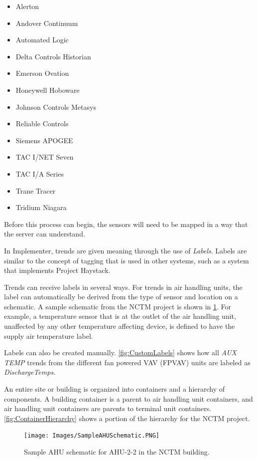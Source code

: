 \begin{itemize}
    \item Alerton
    \item Andover Continuum
    \item Automated Logic
    \item Delta Controls Historian
    \item Emerson Ovation
    \item Honeywell Hoboware
    \item Johnson Controls Metasys
    \item Reliable Controls
    \item Siemens APOGEE
    \item TAC I/NET Seven
    \item TAC I/A Series
    \item Trane Tracer
    \item Tridium Niagara 
\end{itemize}

Before this process can begin, the sensors will need to be mapped in a
way that the server can understand. 

In Implementer, trends are given meaning through the use of
\textit{Labels}. Labels are similar to the concept of tagging that is used
in other systems, such as a system that implements Project Haystack. 

Trends can receive labels in several ways. For trends in air handling
units, the label can automatically be derived from the type of sensor and
location on a schematic. A sample schematic from the NCTM project is
shown in \figref{} \ref{fig:AHUSchematic}. For example, a temperature
sensor that is at the outlet of the air handling unit, unaffected by any
other temperature affecting device, is defined to have the supply air
temperature label. 

Labels can also be created manually. \figref{} \ref{fig:CustomLabels}
shows how all \textit{AUX TEMP} trends from the different fan powered
VAV (FPVAV) units are labeled as \textit{DischargeTemps}.

An entire site or building is organized into containers and a
hierarchy of components. A building container is a parent to air
handling unit containers, and air handling unit containers are parents
to terminal unit containers. \figref{} \ref{fig:ContainerHierarchy}
shows a portion of the hierarchy for the NCTM project.

\begin{figure}
\centering
\texttt{[image: Images/SampleAHUSchematic.PNG]}
\caption{Sample AHU schematic for AHU-2-2 in the NCTM building.}
\label{fig:AHUSchematic}
\end{figure}

